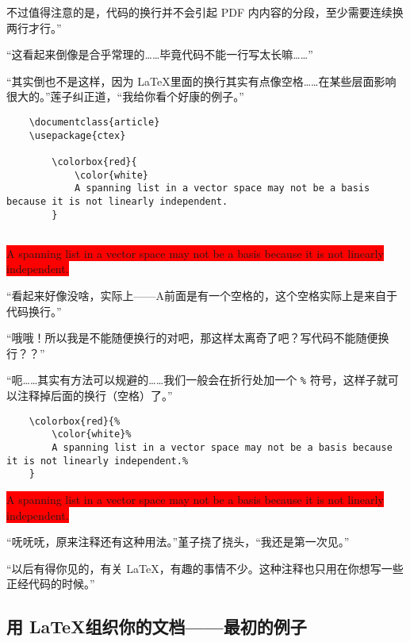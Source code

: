 不过值得注意的是，代码的换行并不会引起 PDF 内内容的分段，至少需要连续换两行才行。”

“这看起来倒像是合乎常理的……毕竟代码不能一行写太长嘛……”

“其实倒也不是这样，因为 \LaTeX 里面的换行其实有点像空格……在某些层面影响很大的。”莲子纠正道，“我给你看个好康的例子。”


\begin{lstlisting}
    \documentclass{article}
    \usepackage{ctex}
    
        \colorbox{red}{
            \color{white} 
            A spanning list in a vector space may not be a basis because it is not linearly independent.
        }
    
\end{lstlisting}

\begin{center}\footnotesize
    \colorbox{red}{
        \color{white}
        A spanning list in a vector space may not be a basis because it is not linearly independent.
    }
\end{center}

“看起来好像没啥，实际上——A前面是有一个空格的，这个空格实际上是来自于代码换行。”

“哦哦！所以我是不能随便换行的对吧，那这样太离奇了吧？写代码不能随便换行？？”

“呃……其实有方法可以规避的……我们一般会在折行处加一个 \verb"%" 符号，这样子就可以注释掉后面的换行（空格）了。”


\begin{lstlisting}
    \colorbox{red}{%
        \color{white}%
        A spanning list in a vector space may not be a basis because it is not linearly independent.%
    }
\end{lstlisting}

\begin{center}\footnotesize
    \colorbox{red}{%
        \color{white}%
        A spanning list in a vector space may not be a basis because it is not linearly independent.%
    }
\end{center}

“呒呒呒，原来注释还有这种用法。”堇子挠了挠头，“我还是第一次见。”

“以后有得你见的，有关 \LaTeX，有趣的事情不少。这种注释也只用在你想写一些正经代码的时候。”

\subsection{用 \LaTeX 组织你的文档——最初的例子}

